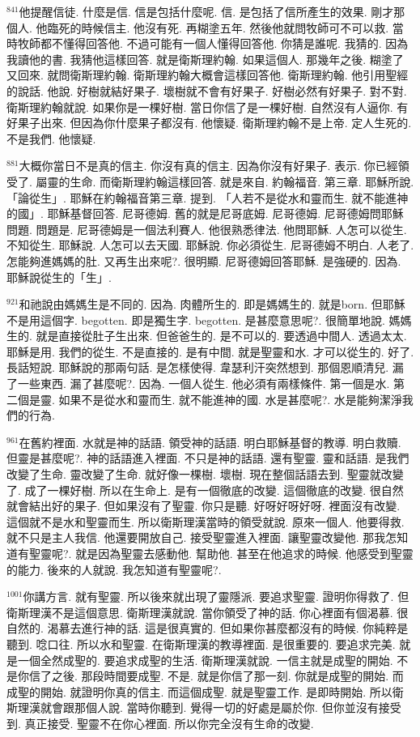 \documentclass{book}
\begin{document}
$^{841}$他提醒信徒.
什麼是信.
信是包括什麼呢.
信.
是包括了信所產生的效果.
剛才那個人.
他臨死的時候信主.
他沒有死.
再糊塗五年.
然後他就問牧師可不可以救.
當時牧師都不懂得回答他.
不過可能有一個人懂得回答他.
你猜是誰呢.
我猜的.
因為我讀他的書.
我猜他這樣回答.
就是衛斯理約翰.
如果這個人.
那幾年之後.
糊塗了又回來.
就問衛斯理約翰.
衛斯理約翰大概會這樣回答他.
衛斯理約翰.
他引用聖經的說話.
他說.
好樹就結好果子.
壞樹就不會有好果子.
好樹必然有好果子.
對不對.
衛斯理約翰就說.
如果你是一棵好樹.
當日你信了是一棵好樹.
自然沒有人逼你.
有好果子出來.
但因為你什麼果子都沒有.
他懷疑.
衛斯理約翰不是上帝.
定人生死的.
不是我們.
他懷疑.

$^{881}$大概你當日不是真的信主.
你沒有真的信主.
因為你沒有好果子.
表示.
你已經領受了.
屬靈的生命.
而衛斯理約翰這樣回答.
就是來自.
約翰福音.
第三章.
耶穌所說.
「論從生」.
耶穌在約翰福音第三章.
提到.
「人若不是從水和靈而生.
就不能進神的國」.
耶穌基督回答.
尼哥德姆.
舊的就是尼哥底姆.
尼哥德姆.
尼哥德姆問耶穌問題.
問題是.
尼哥德姆是一個法利賽人.
他很熟悉律法.
他問耶穌.
人怎可以從生.
不知從生.
耶穌說.
人怎可以去天國.
耶穌說.
你必須從生.
尼哥德姆不明白.
人老了.
怎能夠進媽媽的肚.
又再生出來呢?.
很明顯.
尼哥德姆回答耶穌.
是強硬的.
因為.
耶穌說從生的「生」.

$^{921}$和祂說由媽媽生是不同的.
因為.
肉體所生的.
即是媽媽生的.
就是born.
但耶穌不是用這個字.
begotten.
即是獨生字.
begotten.
是甚麼意思呢?.
很簡單地說.
媽媽生的.
就是直接從肚子生出來.
但爸爸生的.
是不可以的.
要透過中間人.
透過太太.
耶穌是用.
我們的從生.
不是直接的.
是有中間.
就是聖靈和水.
才可以從生的.
好了.
長話短說.
耶穌說的那兩句話.
是怎樣使得.
韋瑟利汗突然想到.
那個恩順清兒.
漏了一些東西.
漏了甚麼呢?.
因為.
一個人從生.
他必須有兩樣條件.
第一個是水.
第二個是靈.
如果不是從水和靈而生.
就不能進神的國.
水是甚麼呢?.
水是能夠潔淨我們的行為.

$^{961}$在舊約裡面.
水就是神的話語.
領受神的話語.
明白耶穌基督的教導.
明白救贖.
但靈是甚麼呢?.
神的話語進入裡面.
不只是神的話語.
還有聖靈.
靈和話語.
是我們改變了生命.
靈改變了生命.
就好像一棵樹.
壞樹.
現在整個話語去到.
聖靈就改變了.
成了一棵好樹.
所以在生命上.
是有一個徹底的改變.
這個徹底的改變.
很自然就會結出好的果子.
但如果沒有了聖靈.
你只是聽.
好呀好呀好呀.
裡面沒有改變.
這個就不是水和聖靈而生.
所以衛斯理漢當時的領受就說.
原來一個人.
他要得救.
就不只是主人我信.
他還要開放自己.
接受聖靈進入裡面.
讓聖靈改變他.
那我怎知道有聖靈呢?.
就是因為聖靈去感動他.
幫助他.
甚至在他追求的時候.
他感受到聖靈的能力.
後來的人就說.
我怎知道有聖靈呢?.

$^{1001}$你講方言.
就有聖靈.
所以後來就出現了靈隱派.
要追求聖靈.
證明你得救了.
但衛斯理漢不是這個意思.
衛斯理漢就說.
當你領受了神的話.
你心裡面有個渴慕.
很自然的.
渴慕去進行神的話.
這是很真實的.
但如果你甚麼都沒有的時候.
你純粹是聽到.
唸口往.
所以水和聖靈.
在衛斯理漢的教導裡面.
是很重要的.
要追求完美.
就是一個全然成聖的.
要追求成聖的生活.
衛斯理漢就說.
一信主就是成聖的開始.
不是你信了之後.
那段時間要成聖.
不是.
就是你信了那一刻.
你就是成聖的開始.
而成聖的開始.
就證明你真的信主.
而這個成聖.
就是聖靈工作.
是即時開始.
所以衛斯理漢就會跟那個人說.
當時你聽到.
覺得一切的好處是屬於你.
但你並沒有接受到.
真正接受.
聖靈不在你心裡面.
所以你完全沒有生命的改變.
\end{document}
